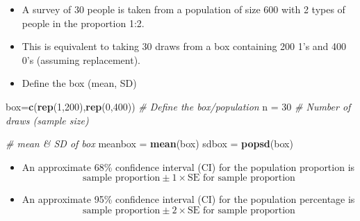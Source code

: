 \documentclass[]{article}
\newenvironment{Shaded}{\begin{snugshade}}{\end{snugshade}}
\newcommand{\CommentTok}[1]{\textcolor[rgb]{0.56,0.35,0.01}{\textit{#1}}}
\newcommand{\DecValTok}[1]{\textcolor[rgb]{0.00,0.00,0.81}{#1}}
\newcommand{\KeywordTok}[1]{\textcolor[rgb]{0.13,0.29,0.53}{\textbf{#1}}}
\newcommand{\NormalTok}[1]{#1}
\newcommand{\OperatorTok}[1]{\textcolor[rgb]{0.81,0.36,0.00}{\textbf{#1}}}
\newcommand{\StringTok}[1]{\textcolor[rgb]{0.31,0.60,0.02}{#1}}
\providecommand{\tightlist}{%
  \setlength{\itemsep}{0pt}\setlength{\parskip}{0pt}}
\begin{document}
\begin{itemize}
\item
  A survey of 30 people is taken from a population of size 600 with 2 types of people in the proportion 1:2.
\item
  This is equivalent to taking 30 draws from a box containing 200 1's and 400 0's (assuming replacement).
\item
  Define the box (mean, SD)
\end{itemize}

\begin{Shaded}
\begin{Highlighting}[]
\NormalTok{box=}\KeywordTok{c}\NormalTok{(}\KeywordTok{rep}\NormalTok{(}\DecValTok{1}\NormalTok{,}\DecValTok{200}\NormalTok{),}\KeywordTok{rep}\NormalTok{(}\DecValTok{0}\NormalTok{,}\DecValTok{400}\NormalTok{))  }\CommentTok{# Define the box/population}
\NormalTok{n =}\StringTok{ }\DecValTok{30} \CommentTok{# Number of draws (sample size)}

\CommentTok{# mean & SD of box}
\NormalTok{meanbox =}\StringTok{ }\KeywordTok{mean}\NormalTok{(box)}
\NormalTok{sdbox =}\StringTok{ }\KeywordTok{popsd}\NormalTok{(box)}
\end{Highlighting}
\end{Shaded}

\begin{itemize}
\tightlist
\item
  An approximate 68\% confidence interval (CI) for the population proportion is
  \[\mbox{sample proportion} \pm 1 \times \mbox{SE for sample proportion} \]
\end{itemize}

\begin{Shaded}
\end{Shaded}

\begin{itemize}
\tightlist
\item
  An approximate 95\% confidence interval (CI) for the population percentage is
  \[\mbox{sample proportion} \pm 2 \times \mbox{SE for sample proportion} \]
\end{itemize}
\end{document}

